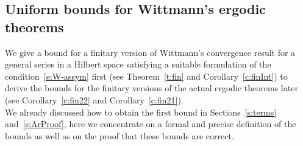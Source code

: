 \subsection{Uniform bounds for Wittmann's ergodic theorems}\label{s:Main}

We give a bound for a finitary version of Wittmann's convergence result for
a general series in a Hilbert space satisfying a suitable formulation
of the condition~\eqref{e:W-assym} first 
(see Theorem~\ref{t:fin} and Corollary~\ref{c:finInt}) to derive the bounds
for the finitary versions of the actual ergodic theorems later
(see Corollary~\ref{c:fin22} and Corollary~\ref{c:fin21}).\\
We already discussed how to obtain the first bound in Sections~\ref{s:terms} and~\ref{s:ArProof},
here we concentrate on a formal and precise definition of the bounds as well as on the proof
that these bounds are correct.

